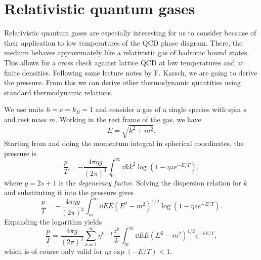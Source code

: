 \section{Relativistic quantum gases}

Relativistic quantum gases are especially interesting for us
to consider because of their
application to low temperatures of the QCD phase diagram. There, the medium
behaves approximately like a relativistic gas of hadronic bound states.
This allows for a cross check against lattice QCD at low temperatures
and at finite densities. Following some lecture notes by F. Karsch,
we are going to derive the
pressure. From this we can derive other thermodynamic quantities
using standard thermodynamic relations.

We use units $\hbar=c=k_B=1$ and consider a gas of a single species
with spin $s$ and rest mass $m$. Working in the rest frame of the gas,
we have
\begin{equation}\label{eq:dispersion}
  E=\sqrt{k^2+m^2}.  
\end{equation}
Starting from  and
doing the momentum integral in spherical coordinates, the pressure is
\begin{equation}
  \frac{p}{T}=-\frac{4\pi\eta g}{(2\pi)^3}\int_0^\infty 
      \dd{k}k^2\log\left(1-\eta z e^{-E/T}\right),
\end{equation}
where $g=2s+1$ is the {\it degeneracy factor}. 
Solving the dispersion relation
for $k$ and substituting it into the pressure gives
\begin{equation}
  \frac{p}{T}=-\frac{4\pi\eta g}{(2\pi)^3}\int_m^\infty 
      \dd{E}E\left(E^2-m^2\right)^{1/2}\log\left(1-\eta z e^{-E/T}\right).
\end{equation}
Expanding the logarithm yields
\begin{equation}\label{eq:pressE}
  \frac{p}{T}=\frac{4\pi g}{(2\pi)^3}\sum_{k=1}^\infty\eta^{k+1}\frac{z^k}{k}\int_m^\infty 
      \dd{E}E\left(E^2-m^2\right)^{1/2}e^{-kE/T},
\end{equation}
which is of course only valid for $\eta z\exp(-E/T)<1$.

